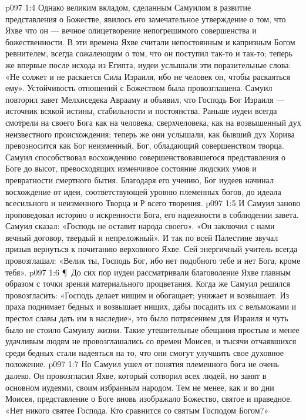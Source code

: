 \vs p097 1:4 Однако великим вкладом, сделанным Самуилом в развитие представления о Божестве, явилось его замечательное утверждение о том, что Яхве  что он --- вечное олицетворение непогрешимого совершенства и божественности. В эти времена Яхве считали непостоянным и капризным Богом ревнителем, всегда сожалеющим о том, что он поступил так\hyp{}то и так\hyp{}то; теперь же впервые после исхода из Египта, иудеи услышали эти поразительные слова: «Не солжет и не раскается Сила Израиля, ибо не человек он, чтобы раскаяться ему». Устойчивость отношений с Божеством была провозглашена. Самуил повторил завет Мелхиседека Аврааму и объявил, что Господь Бог Израиля --- источник всякой истины, стабильности и постоянства. Раньше иудеи всегда смотрели на своего Бога как на человека, сверхчеловека, как на возвышенный дух неизвестного происхождения; теперь же они услышали, как бывший дух Хорива превозносится как Бог неизменный, Бог, обладающий совершенством творца. Самуил способствовал восхождению совершенствовавшегося представления о Боге до высот, превосходящих изменчивое состояние людских умов и превратности смертного бытия. Благодаря его учению, Бог иудеев начинал восхождение от идеи, соответствующей уровню племенных богов, до идеала всесильного и неизменного Творца и Р всего творения.
\vs p097 1:5 И Самуил заново проповедовал историю о искренности Бога, его надежности в соблюдении завета. Самуил сказал: «Господь не оставит народа своего». «Он заключил с нами вечный договор, твердый и непреложный». И так по всей Палестине звучал призыв вернуться к почитанию верховного Яхве. Сей энергичный учитель всегда провозглашал: «Велик ты, Господь Бог, ибо нет подобного тебе и нет Бога, кроме тебя».
\vs p097 1:6 \P\ До сих пор иудеи рассматривали благоволение Яхве главным образом с точки зрения материального процветания. Когда же Самуил решился провозгласить: «Господь делает нищим и обогащает; унижает и возвышает. Из праха поднимает бедных и возвышает нищих, дабы посадить их с вельможами и престол славы дать им в наследие», это было потрясением для Израиля и чуть было не стоило Самуилу жизни. Такие утешительные обещания простым и менее удачливым людям не провозглашались со времен Моисея, и тысячи отчаявшихся среди бедных стали надеяться на то, что они смогут улучшить свое духовное положение.
\vs p097 1:7 Но Самуил ушел от понятия племенного бога не очень далеко. Он провозгласил Яхве, который сотворил всех людей, но занят в основном иудеями, своим избранным народом. Тем не менее, как и во дни Моисея, представление о Боге вновь изображало Божество, святое и праведное. «Нет никого святее Господа. Кто сравнится со святым Господом Богом?»

